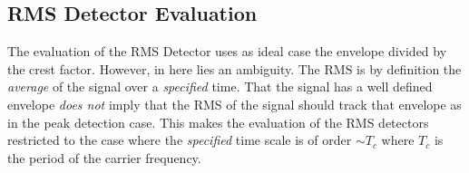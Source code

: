 \documentclass[../main2.tex]{subfiles}
\begin{document}
\subsection{RMS Detector Evaluation}\label{discussion_rms}
The evaluation of the RMS Detector uses as ideal case the envelope divided by the crest factor. However, in here lies an ambiguity. The RMS is by definition the \emph{average} of the signal over a \emph{specified} time. That the signal has a well defined envelope \emph{does not} imply that the RMS of the signal should track that envelope as in the peak detection case. This makes the evaluation of the RMS detectors restricted to the case where the \emph{specified} time scale is of order $\sim T_c$ where $T_c$ is the period of the carrier frequency.
\end{document}
